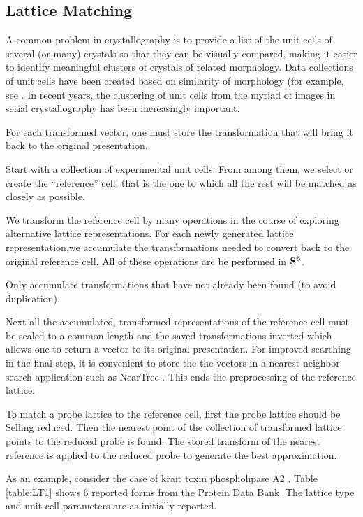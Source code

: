 \documentclass[preprint]{iucr}              %
\numberwithin{equation}{section}
\newcommand{\SVI}[0]{$\bf{S^{6}}$}
\begin{document}
\subsection{Lattice Matching}

A common problem in crystallography is to provide a list of the
unit cells of several (or many) crystals so that they can be visually
compared, making it easier to identify meaningful clusters
of crystals of related morphology. Data collections of
unit cells have been created based on similarity of morphology
(for example, see .  In recent years,
the clustering of unit cells from the myriad of images in serial
crystallography has been increasingly important.

For each transformed vector, one must store the transformation that will bring it back to the original presentation.


Start with a collection of experimental unit cells. From
among them, we select or create the “reference” cell; that is the
one to which all the rest will be matched as closely as possible.

We transform the reference cell by many operations in the
course of exploring alternative lattice representations. For each
newly generated lattice representation,we accumulate the transformations
needed to convert back to the original reference cell.
All of these operations are be performed in \SVI{}.

Only accumulate transformations
that have not already been found (to avoid duplication).

Next all the accumulated, transformed representations of the
reference cell must be scaled  to a common length and the saved transformations
inverted which allows one to return a vector to
its original presentation.  For improved searching
in the final step, it is convenient to store the  the vectors in a nearest neighbor search
application such as NearTree \cite{Andrews2016}. This ends the 
preprocessing of the reference lattice.

To match a probe lattice to the reference cell, first the 
probe lattice should be
Selling reduced. Then the nearest point of the
collection of transformed lattice points to the reduced probe
is found. The stored transform of the nearest reference is
applied to the reduced probe to generate the best approximation.

As an example, consider the case of krait toxin phospholipase A2
\cite{LeTrong2007}. Table \ref{table:LT1} shows 6 reported forms
from the Protein Data Bank. The lattice type and unit cell parameters
are as initially reported. 
\end{document}
